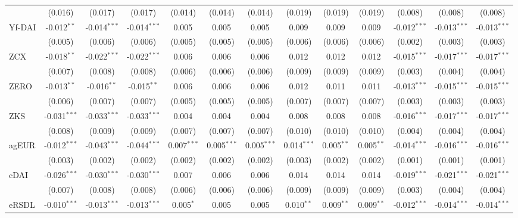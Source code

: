 \begin{table}[!htbp]
\begin{tabular}{@{\extracolsep{5pt}}lcccccccccccc}
  & (0.016) & (0.017) & (0.017) & (0.014) & (0.014) & (0.014) & (0.019) & (0.019) & (0.019) & (0.008) & (0.008) & (0.008) \\
 Yf-DAI & -0.012$^{**}$ & -0.014$^{***}$ & -0.014$^{***}$ & 0.005$^{}$ & 0.005$^{}$ & 0.005$^{}$ & 0.009$^{}$ & 0.009$^{}$ & 0.009$^{}$ & -0.012$^{***}$ & -0.013$^{***}$ & -0.013$^{***}$ \\
  & (0.005) & (0.006) & (0.006) & (0.005) & (0.005) & (0.005) & (0.006) & (0.006) & (0.006) & (0.002) & (0.003) & (0.003) \\
 ZCX & -0.018$^{**}$ & -0.022$^{***}$ & -0.022$^{***}$ & 0.006$^{}$ & 0.006$^{}$ & 0.006$^{}$ & 0.012$^{}$ & 0.012$^{}$ & 0.012$^{}$ & -0.015$^{***}$ & -0.017$^{***}$ & -0.017$^{***}$ \\
  & (0.007) & (0.008) & (0.008) & (0.006) & (0.006) & (0.006) & (0.009) & (0.009) & (0.009) & (0.003) & (0.004) & (0.004) \\
 ZERO & -0.013$^{**}$ & -0.016$^{**}$ & -0.015$^{**}$ & 0.006$^{}$ & 0.006$^{}$ & 0.006$^{}$ & 0.012$^{}$ & 0.011$^{}$ & 0.011$^{}$ & -0.013$^{***}$ & -0.015$^{***}$ & -0.015$^{***}$ \\
  & (0.006) & (0.007) & (0.007) & (0.005) & (0.005) & (0.005) & (0.007) & (0.007) & (0.007) & (0.003) & (0.003) & (0.003) \\
 ZKS & -0.031$^{***}$ & -0.033$^{***}$ & -0.033$^{***}$ & 0.004$^{}$ & 0.004$^{}$ & 0.004$^{}$ & 0.008$^{}$ & 0.008$^{}$ & 0.008$^{}$ & -0.016$^{***}$ & -0.017$^{***}$ & -0.017$^{***}$ \\
  & (0.008) & (0.009) & (0.009) & (0.007) & (0.007) & (0.007) & (0.010) & (0.010) & (0.010) & (0.004) & (0.004) & (0.004) \\
 agEUR & -0.012$^{***}$ & -0.043$^{***}$ & -0.044$^{***}$ & 0.007$^{***}$ & 0.005$^{***}$ & 0.005$^{***}$ & 0.014$^{***}$ & 0.005$^{**}$ & 0.005$^{**}$ & -0.014$^{***}$ & -0.016$^{***}$ & -0.016$^{***}$ \\
  & (0.003) & (0.002) & (0.002) & (0.002) & (0.002) & (0.002) & (0.003) & (0.002) & (0.002) & (0.001) & (0.001) & (0.001) \\
 cDAI & -0.026$^{***}$ & -0.030$^{***}$ & -0.030$^{***}$ & 0.007$^{}$ & 0.006$^{}$ & 0.006$^{}$ & 0.014$^{}$ & 0.014$^{}$ & 0.014$^{}$ & -0.019$^{***}$ & -0.021$^{***}$ & -0.021$^{***}$ \\
  & (0.007) & (0.008) & (0.008) & (0.006) & (0.006) & (0.006) & (0.009) & (0.009) & (0.009) & (0.003) & (0.004) & (0.004) \\
 eRSDL & -0.010$^{***}$ & -0.013$^{***}$ & -0.013$^{***}$ & 0.005$^{*}$ & 0.005$^{}$ & 0.005$^{}$ & 0.010$^{**}$ & 0.009$^{**}$ & 0.009$^{**}$ & -0.012$^{***}$ & -0.014$^{***}$ & -0.014$^{***}$ \\

\end{tabular}
\end{table}
